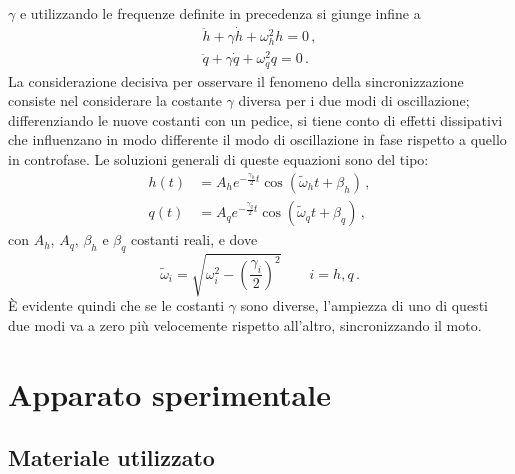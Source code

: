 \documentclass[11pt, a4paper, twoside, italian]{article}
\begin{document}
$\gamma$ e utilizzando le frequenze definite in precedenza si giunge infine a
\begin{equation*}
  \begin{split}
  \ddot h + \gamma \dot h + \omega_h^2 h  = 0 \, ,\\
  \ddot q +\gamma \dot q + \omega_q^2 q = 0 \, .
  \end{split}
\end{equation*}
La considerazione decisiva per osservare il fenomeno della sincronizzazione 
consiste nel considerare la costante $\gamma$ diversa per i due modi di oscillazione;
differenziando le nuove costanti con un pedice, si tiene conto di 
effetti dissipativi che influenzano in modo differente il modo di oscillazione
in fase rispetto a quello in controfase.
Le soluzioni generali di queste equazioni sono del tipo:
\begin{align}
    h(t) &= A_h e^{- \frac{\gamma_h}{2} t} \cos(\tilde{\omega}_h t + \beta_h) \label{equazionefinaleh} \, , \\
    q(t) &= A_q e^{- \frac{\gamma_q}{2} t} \cos(\tilde{\omega}_q t + \beta_q) \label{equazionefinaleq} \, ,
\end{align}
con $A_h$, $A_q$, $\beta_h$ e $\beta_q$ costanti reali, e dove 
\begin{equation}
\tilde{\omega}_i = \sqrt{\omega_i^2 -\left( \frac{\gamma_i}{2} \right)^2} \qquad 
i = h,q 
\, .
\label{equation:omegadef}
\end{equation}
È evidente quindi che se le costanti $\gamma$ sono diverse, l'ampiezza di uno di questi due modi va a zero più velocemente rispetto 
all'altro, sincronizzando il moto.

\section{Apparato sperimentale}
\subsection{Materiale utilizzato}
\end{document}
